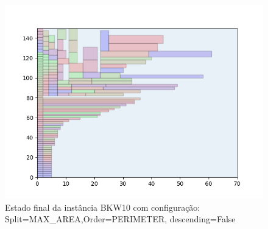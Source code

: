 \begin{figure}[H]
    \centering
    \caption[]{Estado final da instância BKW10 com configuração: Split=MAX_AREA,Order=PERIMETER, descending=False}
    \label{fig:bkw10-max_area-perimeter-false}
    \includegraphics[scale=0.5]{output/figures/bkw/bkw10/max_area/perimeter/false/000}
\end{figure}